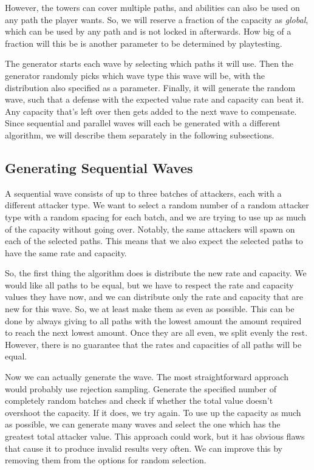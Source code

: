 However, the towers can cover multiple paths, and abilities can also be used on any path the player wants.
So, we will reserve a fraction of the capacity as \emph{global}, which can be used by any path and is not locked in afterwards.
How big of a fraction will this be is another parameter to be determined by playtesting.

The generator starts each wave by selecting which paths it will use.
Then the generator randomly picks which wave type this wave will be, with the distribution also specified as a parameter.
Finally, it will generate the random wave, such that a defense with the expected value rate and capacity can beat it.
Any capacity that's left over then gets added to the next wave to compensate.
Since sequential and parallel waves will each be generated with a different algorithm, we will describe them separately in the following subsections.

\subsection{Generating Sequential Waves}

A sequential wave consists of up to three batches of attackers, each with a different attacker type.
We want to select a random number of a random attacker type with a random spacing for each batch, and we are trying to use up as much of the capacity without going over.
Notably, the same attackers will spawn on each of the selected paths.
This means that we also expect the selected paths to have the same rate and capacity.

So, the first thing the algorithm does is distribute the new rate and capacity.
We would like all paths to be equal, but we have to respect the rate and capacity values they have now, and we can distribute only the rate and capacity that are new for this wave.
So, we at least make them as even as possible.
This can be done by always giving to all paths with the lowest amount the amount required to reach the next lowest amount.
Once they are all even, we split evenly the rest.
However, there is no guarantee that the rates and capacities of all paths will be equal.

Now we can actually generate the wave.
The most straightforward approach would probably use rejection sampling.
Generate the specified number of completely random batches and check if whether the total value doesn't overshoot the capacity.
If it does, we try again.
To use up the capacity as much as possible, we can generate many waves and select the one which has the greatest total attacker value.
This approach could work, but it has obvious flaws that cause it to produce invalid results very often.
We can improve this by removing them from the options for random selection.

